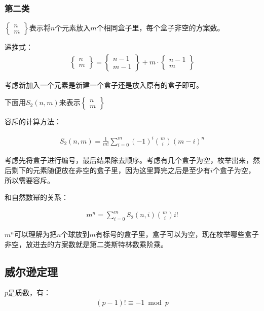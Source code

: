 	
	
\subsubsection{第二类}
$\left\{\begin{array}{cccc}
n \\ m
\end{array}\right\}$表示将$n$个元素放入$m$个相同盒子里，每个盒子非空的方案数。\par
递推式：
\begin{eqnarray*}
\left\{ \begin{array}{cccc}
n \\ m
\end{array}\right\} 
= 
\left\{
\begin{array}{cccc}
n - 1 \\
m - 1
\end{array}
\right\}
+ m \cdot 
\left\{
\begin{array}{cccc}
n - 1 \\
m
\end{array}
\right\}
\end{eqnarray*}
\par
考虑新加入一个元素是新建一个盒子还是放入原有的盒子即可。\par
下面用$S_2(n, m)$来表示$\left\{\begin{array}{cccc}
n \\ m
\end{array}\right\}$ \par
容斥的计算方法：\par
\begin{eqnarray*}
S_2(n, m) = \frac{1}{m!} \sum\limits_{i = 0}^m (-1)^i {m \choose i}(m - i)^n
\end{eqnarray*} \par
考虑先将盒子进行编号，最后结果除去顺序。考虑有几个盒子为空，枚举出来，然后剩下的元素随便放在非空的盒子里，因为这里算完之后是至少有$i$个盒子为空，所以需要容斥。\par

和自然数幂的关系：\par
\begin{eqnarray*}
m^n = \sum\limits_{i = 0}^m S_2(n, i){m \choose i}i!
\end{eqnarray*} \par
$m^n$可以理解为把$n$个球放到$m$有标号的盒子里，盒子可以为空，现在枚举哪些盒子非空，放进去的方案数就是第二类斯特林数乘阶乘。\par

\subsection{威尔逊定理}
$p$是质数，有：
\begin{eqnarray*}
(p - 1)! \equiv -1 \bmod p
\end{eqnarray*}

